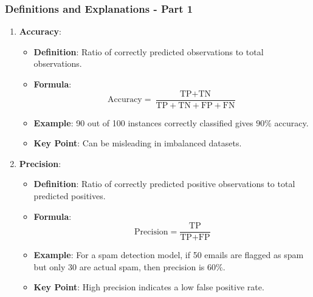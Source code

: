 \documentclass[aspectratio=169]{beamer}
\begin{document}
\begin{frame}[fragile]
    \frametitle{Definitions and Explanations - Part 1}
    \begin{enumerate}
        \item \textbf{Accuracy}:
        \begin{itemize}
            \item \textbf{Definition}: Ratio of correctly predicted observations to total observations.
            \item \textbf{Formula}:
            \begin{equation}
            \text{Accuracy} = \frac{\text{TP} + \text{TN}}{\text{TP} + \text{TN} + \text{FP} + \text{FN}}
            \end{equation}
            \item \textbf{Example}: 90 out of 100 instances correctly classified gives \(90\%\) accuracy.
            \item \textbf{Key Point}: Can be misleading in imbalanced datasets.
        \end{itemize}
        
        \item \textbf{Precision}:
        \begin{itemize}
            \item \textbf{Definition}: Ratio of correctly predicted positive observations to total predicted positives.
            \item \textbf{Formula}:
            \begin{equation}
            \text{Precision} = \frac{\text{TP}}{\text{TP} + \text{FP}}
            \end{equation}
            \item \textbf{Example}: For a spam detection model, if 50 emails are flagged as spam but only 30 are actual spam, then precision is \(60\%\).
            \item \textbf{Key Point}: High precision indicates a low false positive rate.
        \end{itemize}
    \end{enumerate}    
\end{frame}
\end{document}
